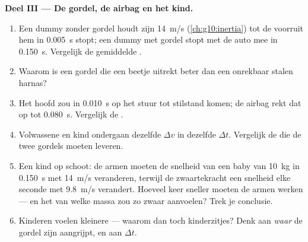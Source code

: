 \begin{problem}
\medskip
\noindent\textbf{Deel III --- De gordel, de airbag en het kind.}
\begin{enumerate}[resume]
  \item Een dummy zonder gordel houdt zijn \qty{14}{m/s}
        (\cref{ch:g10:inertia}) tot de voorruit hem in \qty{0.005}{s}
        stopt; een dummy met gordel stopt met de auto mee in
        \qty{0.150}{s}. Vergelijk de gemiddelde .
  \item Waarom is een gordel die een beetje uitrekt beter dan een
        onrekbaar stalen harnas?
  \item Het hoofd zou in \qty{0.010}{s} op het stuur tot stilstand komen;
        de airbag rekt dat op tot \qty{0.080}{s}. Vergelijk de .
  \item Volwassene en kind ondergaan dezelfde $\Delta v$ in dezelfde
        $\Delta t$. Vergelijk de  die de twee
        gordels moeten leveren.
  \item Een kind op schoot: de armen moeten de snelheid van een baby van
        \qty{10}{kg} in \qty{0.150}{s} met \qty{14}{m/s} veranderen,
        terwijl de zwaartekracht een snelheid elke seconde met
        \qty{9.8}{m/s} verandert. Hoeveel keer sneller moeten de armen
        werken --- en het  van welke massa zou zo zwaar aanvoelen?
        Trek je conclusie.
  \item Kinderen voelen kleinere  --- waarom dan toch
        kinderzitjes? Denk aan \emph{waar} de gordel zijn 
        aangrijpt, en aan $\Delta t$.
\end{enumerate}


\end{problem}
